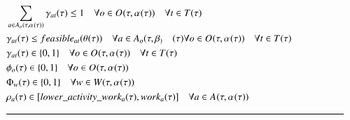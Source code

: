 {\begin{alignat}{2}
		& \sum_{\ElementActivity \in \SetActivity{\VarStrategicWorkOrderAssignment{}{}}{\ElementOperation}} \VarSupervisorAssignment{\ElementActivity}{\ElementTechnician} \leq 1  \quad \forall \ElementOperation \in \SetOperation{}{\VarStrategicWorkOrderAssignment{}{}} \quad \forall \ElementTechnician \in \SetTechnician \\  
		& \VarSupervisorAssignment{\ElementActivity}{\ElementTechnician} \leq \ParFeasible  \quad \forall \ElementActivity \in \SetActivity{\VarTacticalWork}{\ElementOperation} \quad \forall \ElementOperation \in \SetOperation{}{\VarStrategicWorkOrderAssignment{}{}} \quad \forall \ElementTechnician \in \SetTechnician \\
		& \VarSupervisorAssignment{\ElementActivity}{\ElementTechnician} \in \{0, 1\}  \quad \forall \ElementOperation \in \SetOperation{}{\VarStrategicWorkOrderAssignment{}{}} \quad \forall \ElementTechnician \in \SetTechnician \\ 
		& \VarSupervisorOperationWhole \in \{0, 1\}  \quad \forall \ElementOperation \in \SetOperation{}{\VarStrategicWorkOrderAssignment{}{}} \\ 
		& \VarSupervisorWorkOrderWhole \in \{0, 1\}  \quad \forall \ElementWorkOrder \in \SetWorkOrder{,\VarStrategicWorkOrderAssignment{}{}} \\ 
		& \VarActivityWork{\ElementActivity} \in [\ParLowerActivityWork, \ParOperationWork{\ElementActivity}]  \quad \forall \ElementActivity \in \SetActivity{\VarStrategicWorkOrderAssignment{}{}}{}\\ 
		& \text{\rule{\linewidth}{0.8pt}} \notag \label{}                                                                                                                                                                                                                                                                                                                                                                      
	\end{alignat}
}
